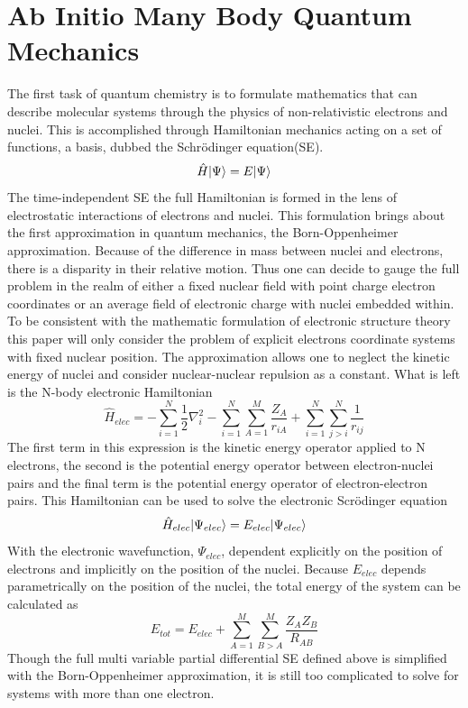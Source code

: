 
\section{Ab Initio Many Body Quantum Mechanics}
 The first task of quantum chemistry is to formulate mathematics that can describe molecular systems through the physics of non-relativistic electrons and nuclei. This is accomplished through Hamiltonian mechanics acting on a set of functions, a basis, dubbed the Schr{\"o}dinger equation(SE).
   \begin{equation}
    \hat{H}| \Psi \rangle = E| \Psi \rangle
   \end{equation}
  The time-independent SE the full Hamiltonian is formed in the lens of electrostatic interactions of electrons and nuclei.  This formulation brings about the first approximation in quantum mechanics, the Born-Oppenheimer approximation.\cite{SzaboAttila1982}  Because of the difference in mass between nuclei and electrons, there is a disparity in their relative motion.  Thus one can decide to gauge the full problem in the realm of either a fixed nuclear field with point charge electron coordinates or an average field of electronic charge with nuclei embedded within. To be consistent with the mathematic formulation of electronic structure theory this paper will only consider the problem of explicit electrons coordinate systems with fixed nuclear position.  The approximation allows one to neglect the kinetic energy of nuclei and consider nuclear-nuclear repulsion as a constant.  What is left is the N-body electronic Hamiltonian
   \begin{equation}
    \hat{H}_{elec} = -\sum_{i=1}^{N} \frac{1}{2} \nabla_{i}^{2} - \sum_{i=1}^{N}\sum_{A=1}^{M} \frac{Z_A}{r_{iA}} + \sum_{i=1}^{N}\sum_{j>i}^{N} \frac{1}{r_{ij}}
   \end{equation}
  The first term in this expression is the kinetic energy operator applied to N electrons, the second is the potential energy operator between electron-nuclei pairs and the final term is the potential energy operator of electron-electron pairs.  This Hamiltonian can be used to solve the electronic Scr{\"o}dinger equation
    \begin{equation}
     \hat{H}_{elec} | \Psi_{elec} \rangle = E_{elec}| \Psi_{elec} \rangle
    \end{equation}
  With the electronic wavefunction, $\Psi_{elec}$, dependent explicitly on the position of electrons and implicitly on the position of the nuclei.  Because $E_{elec}$ depends parametrically on the position of the nuclei, the total energy of the system can be calculated as 
    \begin{equation}
      E_{tot} = E_{elec} + \sum_{A=1}^{M} \sum_{B>A}^{M} \frac{Z_A Z_B}{R_{AB}}
    \end{equation}
  Though the full multi variable partial differential SE defined above is simplified with the Born-Oppenheimer approximation, it is still too complicated to solve for systems with more than one electron.\cite{SzaboAttila1982}
